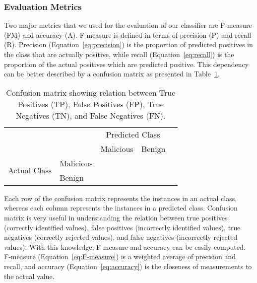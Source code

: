 \documentclass[conference]{IEEEtran}
\begin{document}
\subsubsection{Evaluation Metrics}
Two major metrics that we used for the evaluation of our classifier are F-measure (FM) and accuracy (A). F-measure is defined in terms of precision (P) and recall (R). Precision (Equation~\ref{eq:precision}) is the proportion of predicted positives in the class that are actually positive, while recall (Equation~\ref{eq:recall}) is the proportion of the actual positives which are predicted positive. This dependency can be better described by a confusion matrix as presented in Table~\ref{confusionMatrix}. 
\begin{table}[h]
\small
\begin{center}
\begin{tabular}{l|l|c|c|c}
\multicolumn{2}{c}{}&\multicolumn{2}{c}{Predicted Class}&\\
\cline{3-4}
\multicolumn{2}{c|}{}&Malicious&Benign\\
\cline{2-4}
\multirow{2}{*}{Actual Class}& Malicious &  & \\
\cline{2-4}
& Benign &  & \\
\cline{2-4}
\end{tabular}
\caption{\label{confusionMatrix} Confusion matrix showing relation between True Positives (TP), False Positives (FP), True Negatives (TN), and False Negatives (FN).}
\end{center}
\end{table}
Each row of the confusion matrix represents the instances in an actual class, whereas each column represents the instances in a predicted class. Confusion matrix is very useful in understanding the relation between true positives (correctly identified values), false positives (incorrectly identified values), true negatives (correctly rejected values), and false negatives (incorrectly rejected values). With this knowledge, F-measure and accuracy can be easily computed. F-measure (Equation~\ref{eq:F-measure}) is a weighted average of precision and recall, and accuracy (Equation~\ref{eq:accuracy}) is the closeness of measurements to the actual value. 


\vspace{-3ex} 

\vspace{-3ex} 

\vspace{-3ex} 
\end{document}
